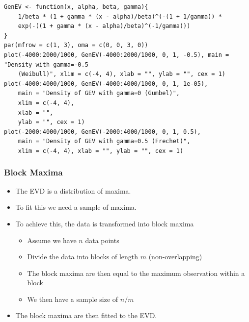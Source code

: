 \documentclass{article}
\begin{document}
\begin{lstlisting}
GenEV <- function(x, alpha, beta, gamma){
    1/beta * (1 + gamma * (x - alpha)/beta)^(-(1 + 1/gamma)) * 
    exp(-((1 + gamma * (x - alpha)/beta)^(-1/gamma)))
}
par(mfrow = c(1, 3), oma = c(0, 0, 3, 0))
plot(-4000:2000/1000, GenEV(-4000:2000/1000, 0, 1, -0.5), main = "Density with gamma=-0.5
    (Weibull)", xlim = c(-4, 4), xlab = "", ylab = "", cex = 1)
plot(-4000:4000/1000, GenEV(-4000:4000/1000, 0, 1, 1e-05), 
    main = "Density of GEV with gamma=0 (Gumbel)", 
    xlim = c(-4, 4), 
    xlab = "", 
    ylab = "", cex = 1)
plot(-2000:4000/1000, GenEV(-2000:4000/1000, 0, 1, 0.5),
    main = "Density of GEV with gamma=0.5 (Frechet)", 
    xlim = c(-4, 4), xlab = "", ylab = "", cex = 1)
\end{lstlisting}



\subsubsection{Block Maxima}
\begin{itemize}
    \item The EVD is a distribution of maxima.
    \item To fit this we need a sample of maxima.
    \item To achieve this, the data is transformed into block maxima
    \begin{itemize}
        \item Assume we have $n$ data points
        \item Divide the data into blocks of length $m$ (non-overlapping)
        \item The block maxima are then equal to the maximum observation within a block
        \item We then have a sample size of $n/m$
    \end{itemize}
    \item The block maxima are then fitted to the EVD.
\end{itemize}
\end{document}
